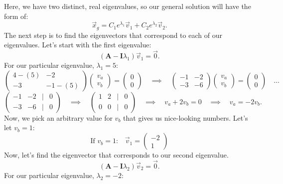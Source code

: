 \documentclass[a4paper,12pt]{article}
\begin{document}
Here, we have two distinct, real eigenvalues, so our general solution will have the form of:
$$ \boxed{\vec{x}_g = C_1e^{\lambda_1}\vec{v}_1 + C_2e^{\lambda_2}\vec{v}_2.} $$
The next step is to find the eigenvectors that correspond to each of our eigenvalues. Let's start with the first eigenvalue:
$$ (\mathbf{A} - \mathbf{I}\lambda_1)\vec{v}_1 = \vec{0}. $$
For our particular eigenvalue, $\lambda_1=5$:
$$ \left(\begin{matrix}
	4-(5) & -2 \\
	-3 & -1-(5)
\end{matrix}\right)\left(\begin{matrix}
	v_a \\
	v_b
\end{matrix}\right) = \left(\begin{matrix}
	0\\
	0
\end{matrix}\right) \quad\implies\quad \left(\begin{matrix}-1 & -2 \\ -3 & -6\end{matrix}\right)\left(\begin{matrix}v_a \\ v_b\end{matrix}\right)=\left(\begin{matrix}0 \\ 0\end{matrix}\right) \quad\ldots $$
$$ \left(\begin{matrix}
	-1 & -2 & | & 0 \\
	-3 & -6 & | & 0
\end{matrix}\right) \quad\implies\quad \left(\begin{matrix}
	1 & 2 & | & 0 \\
	0 & 0 & | & 0
\end{matrix}\right) \quad\implies\quad v_a + 2v_b = 0 \quad\implies\quad  v_a=-2v_b.$$
Now, we pick an arbitrary value for $v_b$ that gives us nice-looking numbers. Let's let $v_b=1$:
$$ \text{If $v_b=1$:}\quad \boxed{\vec{v}_1 = \left(\begin{matrix}
	-2\\
	1
\end{matrix}\right)} $$
Now, let's find the eigenvector that corresponds to our second eigenvalue.
$$ (\mathbf{A} - \mathbf{I}\lambda_2)\vec{v}_2 = \vec{0}. $$
For our particular eigenvalue, $\lambda_2=-2$:
\end{document}
